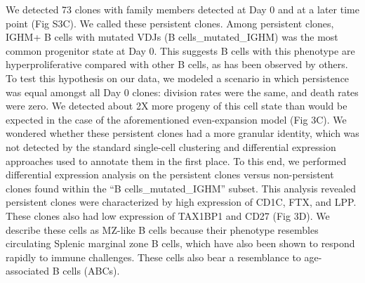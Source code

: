 We detected 73 clones with family members detected at Day 0 and at a later time point (Fig S3C). We called these persistent clones. Among persistent clones, IGHM+ B cells with mutated VDJs (B cells\_mutated\_IGHM) was the most common progenitor state at Day 0. This suggests B cells with this phenotype are hyperproliferative compared with other B cells, as has been observed by others\cite{seifert_functional_2015}. To test this hypothesis on our data, we modeled a scenario in which persistence was equal amongst all Day 0 clones: division rates were the same, and death rates were zero. We detected about 2X more progeny of this cell state than would be expected in the case of the aforementioned even-expansion model (Fig 3C). We wondered whether these persistent clones had a more granular identity, which was not detected by the standard single-cell clustering and differential expression approaches used to annotate them in the first place. To this end, we performed differential expression analysis on the persistent clones versus non-persistent clones found within the “B cells\_mutated\_IGHM” subset. This analysis revealed persistent clones were characterized by high expression of CD1C, FTX, and LPP. These clones also had low expression of TAX1BP1 and CD27 (Fig 3D). We describe these cells as MZ-like B cells because their phenotype resembles circulating Splenic marginal zone B cells, which have also been shown to respond rapidly to immune challenges\cite{weller_human_2004}. These cells also bear a resemblance to age-associated B cells (ABCs)\cite{cancro_age-associated_2020}.


